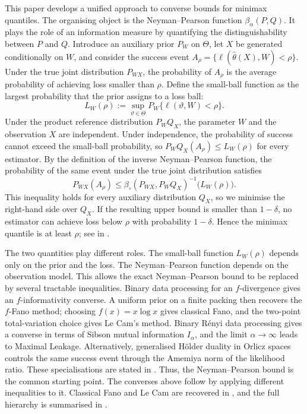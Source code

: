 \documentclass[11pt]{article}
\theoremstyle{definition}
\theoremstyle{remark}
\newcommand{\1}{\boldsymbol{1}}
\begin{document}
This paper develops a unified approach to converse bounds for minimax
quantiles. The organising object is the Neyman--Pearson function
\(\beta_\alpha(P,Q)\). It plays the role of an information measure by
quantifying the distinguishability between \(P\) and \(Q\). Introduce an auxiliary prior \(P_W\) on
\(\Theta\), let \(X\) be generated conditionally on \(W\), and consider
the success event
\(A_\rho=\{\ell(\widehat\theta(X),W)<\rho\}\). Under the true joint distribution
\(P_{WX}\), the probability of \(A_\rho\) is the average probability of
achieving loss smaller than \(\rho\). Define the small-ball function
as the largest probability that the prior assigns to a loss ball:
\[
L_W(\rho):=
\sup_{\vartheta\in\Theta}
P_W\{\ell(\vartheta,W)<\rho\}.
\]
Under the product reference distribution \(P_WQ_X\), the parameter \(W\) and
the observation \(X\) are independent. Under independence, the probability
of success cannot exceed the small-ball probability, so
\(P_WQ_X(A_\rho)\leq L_W(\rho)\) for every estimator. By the definition of
the inverse Neyman--Pearson function, the probability of the same event under
the true joint distribution satisfies
\[
P_{WX}(A_\rho)
\leq
\beta_{\circ}(P_{WX},P_WQ_X)^{-1}\bigl(L_W(\rho)\bigr).
\]
This inequality holds for every auxiliary distribution \(Q_X\), so we
minimise the right-hand side over \(Q_X\). If the resulting upper bound is
smaller than \(1-\delta\), no estimator can achieve loss below \(\rho\) with
probability \(1-\delta\). Hence the minimax quantile is at least \(\rho\); see
 in .

The two quantities play different roles. The small-ball function
\(L_W(\rho)\) depends only on the prior and the loss. The Neyman--Pearson
function depends on the observation model. This allows the exact
Neyman--Pearson bound to be replaced by several tractable inequalities.
Binary data processing for an
\(f\)-divergence gives an \(f\)-informativity converse. A uniform prior on
a finite packing then recovers the \(f\)-Fano method; choosing $f(x)=x\log x$ gives
classical Fano, and the two-point total-variation choice gives Le Cam's
method. Binary R\'enyi data processing gives a converse in terms of
Sibson mutual information \(I_\alpha\), and the limit \(\alpha\to\infty\)
leads to Maximal Leakage. Alternatively, generalised H\"older duality in
Orlicz spaces controls the same success event through the Amemiya norm of
the likelihood ratio. These specialisations are stated in
.
Thus, the Neyman--Pearson bound is the common starting point. The
converses above follow by applying different inequalities to it.
Classical Fano and Le Cam are recovered in
, and the full hierarchy is summarised
in .
\end{document}
